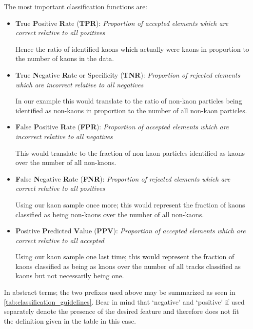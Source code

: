 The most important classification functions are:
\begin{itemize}
    \item \textbf{T}rue \textbf{P}ositive \textbf{R}ate (\textbf{TPR}): \textit{Proportion of accepted elements which are correct relative to all positives}

    \nobreak
    Hence the ratio of identified kaons which actually were kaons in proportion to the number of kaons in the data.

    \item \textbf{T}rue \textbf{N}egative \textbf{R}ate or Specificity (\textbf{TNR}): \textit{Proportion of rejected elements which are incorrect relative to all negatives}

    \nobreak
    In our example this would translate to the ratio of non-kaon particles being identified as non-kaons in proportion to the number of all non-kaon particles.

    \item \textbf{F}alse \textbf{P}ositive \textbf{R}ate (\textbf{FPR}): \textit{Proportion of accepted elements which are incorrect relative to all negatives}

    \nobreak
    This would translate to the fraction of non-kaon particles identified as kaons over the number of all non-kaons.

    \item \textbf{F}alse \textbf{N}egative \textbf{R}ate (\textbf{FNR}): \textit{Proportion of rejected elements which are correct relative to all positives}

    \nobreak
    Using our kaon sample once more; this would represent the fraction of kaons classified as being non-kaons over the number of all non-kaons.

    \item \textbf{P}ositive \textbf{P}redicted \textbf{V}alue (\textbf{PPV}): \textit{Proportion of accepted elements which are correct relative to all accepted}

    \nobreak
    Using our kaon sample one last time; this would represent the fraction of kaons classified as being as kaons over the number of all tracks classified as kaons but not necessarily being one.

\end{itemize}

In abstract terms; the two prefixes used above may be summarized as seen in \autoref{tab:classification_guidelines}. Bear in mind that `negative' and `positive' if used separately denote the presence of the desired feature and therefore does not fit the definition given in the table in this case.

